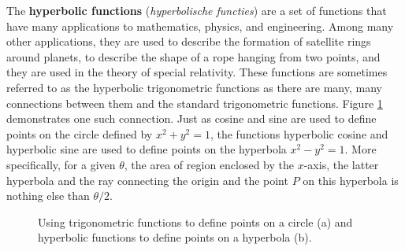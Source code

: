 The \textbf{hyperbolic functions} (\textit{hyperbolische functies}) are a set of functions that have many applications to mathematics, physics, and engineering. Among many other applications, they are used to describe the formation of satellite rings around planets, to describe the shape of a rope hanging from two points, and they are used in the theory of special relativity. These functions are sometimes referred to as the hyperbolic trigonometric functions as there are many, many connections between them and the standard trigonometric functions. Figure \ref{fig_trans_38} demonstrates one such connection. Just as cosine and sine are used to define points on the circle defined by $x^2+y^2=1$, the functions hyperbolic cosine and hyperbolic sine are used to define points on the hyperbola $x^2-y^2=1$. More specifically, for a given $\theta$, the area of region enclosed by the $x$-axis, the latter hyperbola and the ray connecting the origin and the point $P$ on this hyperbola is nothing else than $\theta/2$. 
 


\begin{figure}[h]
			\centering
\centerline{
\hspace{0.1cm}
}
	\caption{Using trigonometric functions to define points on a circle (a) and hyperbolic functions to define points on a hyperbola (b).}
	\label{fig_trans_38}
\end{figure}

